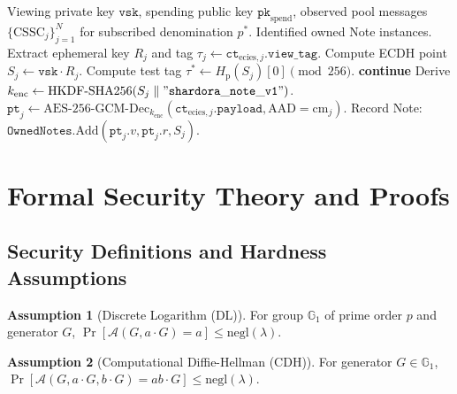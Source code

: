 \documentclass[journal,10pt,twocolumn]{IEEEtran}
\theoremstyle{definition}
\newtheorem{assumption}{Assumption}
\theoremstyle{remark}
\begin{document}
\begin{algorithm}[h]
\caption{Two-Tier Trial Decryption Pipeline}
\label{alg:trial_decryption}
\begin{algorithmic}[1]
\REQUIRE Viewing private key $\mathtt{vsk}$, spending public key $\mathtt{pk}_{\text{spend}}$, observed pool messages $\{\text{CSSC}_j\}_{j=1}^N$ for subscribed denomination $p^*$.
\ENSURE Identified owned Note instances.
    \STATE Extract ephemeral key $R_j$ and tag $\tau_j \leftarrow \mathtt{ct}_{\text{ecies}, j}.\mathtt{view\_tag}$.
    \STATE Compute ECDH point $S_j \leftarrow \mathtt{vsk} \cdot R_j$.
    \STATE Compute test tag $\tau^* \leftarrow H_{\text{p}}(S_j)[0] \pmod{256}$.
        \STATE \textbf{continue} 
    \ENDIF
    \STATE Derive $k_{\text{enc}} \leftarrow \text{HKDF-SHA256}(S_j \parallel \mathtt{"shardora\_note\_v1"})$.
    \STATE $\mathtt{pt}_j \leftarrow \text{AES-256-GCM-Dec}_{k_{\text{enc}}}(\mathtt{ct}_{\text{ecies}, j}.\mathtt{payload}, \text{AAD}=\text{cm}_j)$.
        \STATE Record Note: $\mathtt{OwnedNotes}.\text{Add}(\mathtt{pt}_j.v, \mathtt{pt}_j.r, S_j)$.
    \ENDIF
\ENDFOR
\end{algorithmic}
\end{algorithm}

\section{Formal Security Theory and Proofs}

\subsection{Security Definitions and Hardness Assumptions}

\begin{assumption}[Discrete Logarithm (DL)]
For group $\mathbb{G}_1$ of prime order $p$ and generator $G$, $\Pr[\mathcal{A}(G, a \cdot G) = a] \le \text{negl}(\lambda)$.
\end{assumption}

\begin{assumption}[Computational Diffie-Hellman (CDH)]
For generator $G \in \mathbb{G}_1$, $\Pr[\mathcal{A}(G, a \cdot G, b \cdot G) = ab \cdot G] \le \text{negl}(\lambda)$.
\end{assumption}
\end{document}
